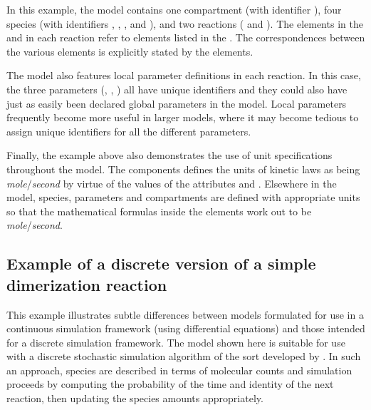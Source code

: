 
In this example, the model contains one compartment (with
identifier ), four species (with identifiers
, , , and ), and two reactions
( and ).  The elements in the
 and  in each
reaction refer to elements listed in the .
The correspondences between the various elements is explicitly
stated by the  elements.

The model also features local parameter definitions in each
reaction.  In this case, the three parameters (,
, ) all have unique identifiers and they could
also have just as easily been declared global parameters in the
model.  Local parameters frequently become more useful in larger
models, where it may become tedious to assign unique identifiers
for all the different parameters.

Finally, the example above also demonstrates the use of unit
specifications throughout the model.  The  components
defines the units of kinetic laws as being
\emph{mole}/\emph{second} by virtue of the values of the
attributes  and .  Elsewhere
in the model, species, parameters and compartments are defined
with appropriate units so that the mathematical formulas inside
the  elements work out to be
\emph{mole}/\emph{second}.   


\subsection{Example of a discrete version of a simple dimerization reaction}
\label{sec:discrete-eg}

This example illustrates subtle differences between models
formulated for use in a continuous simulation framework (\eg using
differential equations) and those intended for a discrete
simulation framework.  The model shown here is suitable for use
with a discrete stochastic simulation algorithm of the sort
developed by \cite{gillespie:1977}.  In such an approach, species
are described in terms of molecular counts and simulation
proceeds by computing the probability of the time and identity of
the next reaction, then updating the species amounts
appropriately.

